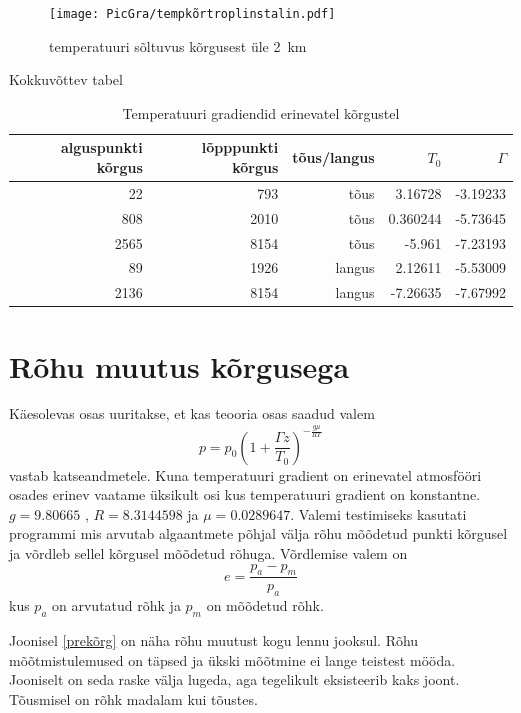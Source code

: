 \documentclass{trkut}%
\begin{document}
\begin{figure}[h]
	\texttt{[image: PicGra/tempkõrtroplinstalin.pdf]}
 	\caption{temperatuuri sõltuvus kõrgusest üle \SI{2}{km}}
 	\label{tempkõrtroplinstalin}%
\end{figure}

Kokkuvõttev tabel
\begin{table}[htb]
	\caption{Temperatuuri gradiendid erinevatel kõrgustel}
	\begin{tabular}{r|r|r|r|r}
		\hline
		alguspunkti kõrgus & lõpppunkti kõrgus & tõus/langus & $T_0$ & $\Gamma$ \\
		\hline
		22 & 793 & tõus & 3.16728 & -3.19233 \\
		808 & 2010 & tõus & 0.360244 & -5.73645 \\
		2565 & 8154 & tõus & -5.961 & -7.23193 \\
		89 & 1926 & langus & 2.12611 & -5.53009 \\
		2136 & 8154 & langus & -7.26635 & -7.67992
	\end{tabular}
\end{table}


\section{Rõhu muutus kõrgusega}
Käesolevas osas uuritakse, et kas teooria osas saadud valem
\begin{equation*}
p = p_0 \left(1+\frac{\Gamma z}{T_0}\right)^{-\frac{g\mu}{R\Gamma}}
\end{equation*}
vastab katseandmetele. Kuna temperatuuri gradient on erinevatel atmosfööri osades erinev vaatame üksikult osi kus temperatuuri gradient on konstantne. $g = 9.80665 $ , $R = 8.3144598$ ja $\mu = 0.0289647$. Valemi testimiseks kasutati programmi mis arvutab algaantmete põhjal välja rõhu mõõdetud punkti kõrgusel ja võrdleb sellel kõrgusel mõõdetud rõhuga. Võrdlemise valem on
\begin{equation*}
e = \frac{p_a-p_m}{p_a}
\end{equation*}
kus $p_a$ on arvutatud rõhk ja $p_m$ on mõõdetud rõhk.


Joonisel \ref{prekõrg} on näha rõhu muutust kogu lennu jooksul. Rõhu mõõtmistulemused on täpsed ja ükski mõõtmine ei lange teistest mööda. Jooniselt on seda raske välja lugeda, aga tegelikult eksisteerib kaks joont. Tõusmisel on rõhk madalam kui tõustes.
\end{document}
